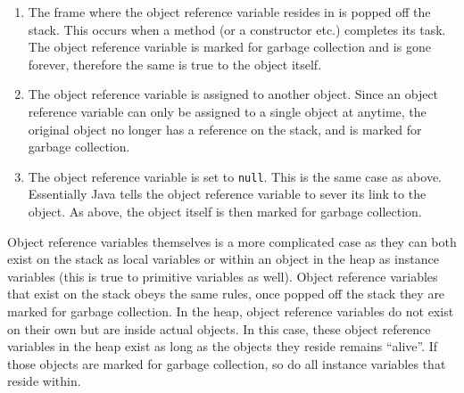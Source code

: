 \documentclass{tufte-handout}
\begin{document}
    \begin{enumerate}
        \item The frame where the object reference variable resides in is popped off the stack. This occurs when a method (or a constructor etc.) completes its task. The object reference variable is marked for garbage collection and is gone forever, therefore the same is true to the object itself.
        \item The object reference variable is assigned to another object. Since an object reference variable can only be assigned to a single object at anytime, the original object no longer has a reference on the stack, and is marked for garbage collection.
        \item The object reference variable is set to \texttt{null}. This is the same case as above. Essentially Java tells the object reference variable to sever its link to the object. As above, the object itself is then marked for garbage collection.
    \end{enumerate}

    Object reference variables themselves is a more complicated case as they can both exist on the stack as local variables or within an object in the heap as instance variables (this is true to primitive variables as well). Object reference variables that exist on the stack obeys the same rules, once popped off the stack they are marked for garbage collection. In the heap, object reference variables do not exist on their own but are inside actual objects. In this case, these object reference variables in the heap exist as long as the objects they reside remains ``alive''. If those objects are marked for garbage collection, so do all instance variables that reside within. 
\end{document}
